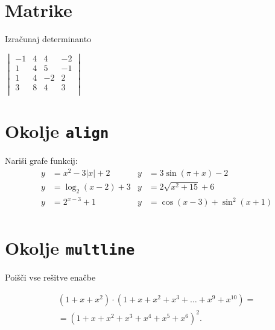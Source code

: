 \documentclass[a4paper,12pt]{article}
\begin{document}
\section*{Matrike}
Izračunaj determinanto
    
    \begin{center}
      
      $\begin{vmatrix}
        -1 & 4 & 4 & -2 \\
        1 & 4 & 5 & -1 \\
        1 & 4 & -2 & 2 \\
        3 & 8 & 4 & 3 \\
      \end{vmatrix}$
    \end{center}

\section*{Okolje \texttt{align}}
Nariši grafe funkcij:
\begin{align*}
y &= x^2 - 3|x| + 2   & y &= 3 \sin(\pi+x) - 2\\
y &= \log_2(x-2) + 3  & y &= 2 \sqrt{x^2+15} + 6\\
y &= 2^{x-3} + 1      & y &= \cos(x-3) + \sin^2(x+1)\\
   \end{align*}

\section*{Okolje \texttt{multline}}
Poišči vse rešitve enačbe

\begin{multline*}
   (1+x+x^2) \cdot (1+x+x^2+x^3+\ldots+x^9+x^{10})=\\
   =(1+x+x^2+x^3+x^4+x^5+x^6)^2.
   \end{multline*}
   
\end{document}
